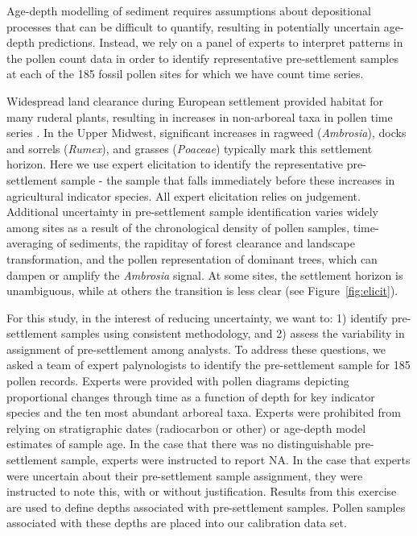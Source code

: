 \documentclass[12pt]{article}
\begin{document}
Age-depth modelling of sediment requires assumptions about
depositional processes that can be difficult to quantify, resulting in
potentially uncertain age-depth predictions. Instead, we rely on a
panel of experts to interpret patterns in the pollen count data in
order to identify representative pre-settlement samples at each of the
185 fossil pollen sites for which we have count time series.

Widespread land clearance during European settlement provided habitat
for many ruderal plants, resulting in increases in non-arboreal taxa
in pollen time series \citep{mcandrews1988human}. In the Upper
Midwest, significant increases in ragweed (\textit{Ambrosia}), docks
and sorrels (\textit{Rumex}), and grasses (\textit{Poaceae}) typically
mark this settlement horizon. Here we use expert elicitation to
identify the representative pre-settlement sample - the sample that
falls immediately before these increases in agricultural indicator
species. All expert elicitation relies on judgement. Additional
uncertainty in pre-settlement sample identification varies widely
among sites as a result of the chronological density of pollen
samples, time-averaging of sediments, the rapiditay of forest
clearance and landscape transformation, and the pollen representation
of dominant trees, which can dampen or amplify the \textit{Ambrosia}
signal. At some sites, the settlement horizon is unambiguous, while at
others the transition is less clear (see Figure~\ref{fig:elicit}).

For this study, in the interest of reducing uncertainty, we want to:
1) identify pre-settlement samples using consistent methodology, and
2) assess the variability in assignment of pre-settlement among
analysts. To address these questions, we asked a team of expert
palynologists to identify the pre-settlement sample for 185 pollen
records. Experts were provided with pollen diagrams depicting
proportional changes through time as a function of depth for key
indicator species and the ten most abundant arboreal taxa. Experts
were prohibited from relying on stratigraphic dates (radiocarbon or
other) or age-depth model estimates of sample age. In the case that
there was no distinguishable pre-settlement sample, experts were
instructed to report NA. In the case that experts were uncertain about
their pre-settlement sample assignment, they were instructed to note
this, with or without justification. Results from this exercise are
used to define depths associated with pre-settlement samples. Pollen
samples associated with these depths are placed into our calibration
data set.
\end{document}
